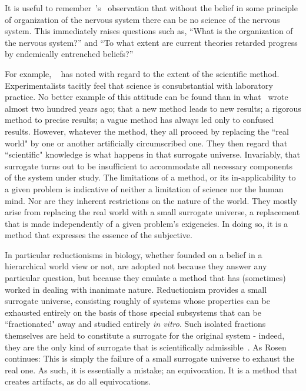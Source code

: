 \documentclass[11pt,3p,twocolumn]{JMN}
\begin{document}
It is useful to remember~\citeauthor{jacobson93}'s~\citeyear{jacobson93} observation that without the belief in some principle of organization of the nervous system there can
be no science of the nervous system. This immediately raises questions such as, ``What is the organization of the nervous system?'' and ``To what extent are current theories retarded progress by endemically entrenched beliefs?''

For example, ~\citet{rosen96} has noted with regard to the extent of the scientific method. Experimentalists tacitly feel that science is consubstantial with laboratory practice. No better example of this attitude can be found than in what~\citet{flourens24} wrote almost two hundred years ago; that a new method leads to new results; a rigorous method to precise results; a vague method has always led only to confused results. However, whatever the method, they all proceed by replacing the ``real world" by one or another artificially circumscribed one. They then regard that ``scientific" knowledge is what happens in that surrogate universe. Invariably, that surrogate turns out to be insufficient to accommodate all necessary components of the system under study. The limitations of a method, or its in-applicability to a given problem is indicative of neither a limitation of science nor the human mind. Nor are they inherent restrictions on the nature of the world.  They mostly arise from replacing the real world with a small surrogate universe, a replacement that is made independently of a given problem's exigencies. In doing so, it is a method that expresses the essence of the subjective.

In particular reductionisms in biology, whether founded on a belief in a hierarchical world view or not, are adopted not because they answer any particular question, but because they emulate a method that has (sometimes) worked in dealing with inanimate nature. Reductionism provides a small surrogate universe, consisting roughly of systems whose properties can be exhausted entirely on the basis of those special subsystems that can be ``fractionated" away and studied entirely \textit{in vitro}. Such isolated fractions themselves are held to constitute a surrogate for the original system - indeed, they are the only kind of surrogate that is scientifically admissible~\citep{rosen96}. As Rosen continues: This is simply the failure of a small surrogate universe to exhaust the real one. As such, it is essentially a mistake; an equivocation. It is a method that creates artifacts, as do all equivocations.
\end{document}
